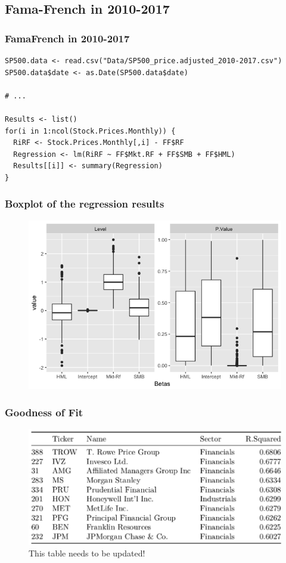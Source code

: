 \documentclass{beamer}
\begin{document}
\subsection{Fama-French in 2010-2017}
\begin{frame}[fragile]
\frametitle{FamaFrench in 2010-2017}
\begin{lstlisting}
SP500.data <- read.csv("Data/SP500_price.adjusted_2010-2017.csv")
SP500.data$date <- as.Date(SP500.data$date)

# ...

Results <- list()
for(i in 1:ncol(Stock.Prices.Monthly)) {
  RiRF <- Stock.Prices.Monthly[,i] - FF$RF
  Regression <- lm(RiRF ~ FF$Mkt.RF + FF$SMB + FF$HML)
  Results[[i]] <- summary(Regression)
}
\end{lstlisting}
\end{frame}

\begin{frame}
\frametitle{Boxplot of the regression results}

\begin{figure}
\centering
\includegraphics[scale=.4]{1FF3Betas.png}
\end{figure}


\end{frame}

\begin{frame}[fragile]
\frametitle{Goodness of Fit}
\begin{figure}
\centering
\includegraphics[scale=.5]{goodnessoffittable.png}%
\caption{This table needs to be updated! }%
\end{figure}

\end{frame}
\end{document}
